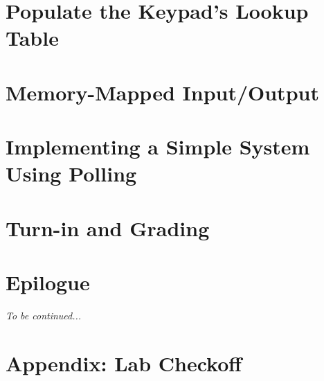     \section{Populate the Keypad's Lookup Table} \label{sec:populateKeypad}         

    \section{Memory-Mapped Input/Output} \label{sec:MemMapIO}                       

    \section {Implementing a Simple System Using Polling} \label{sec:SimpleSystem}  

    \section{Turn-in and Grading}                                                   

    \section*{Epilogue}                                                             \JeffGoldblum

    \textit{To be continued...}

    \newpage\appendix

    \section{Appendix: Lab Checkoff}                                                


